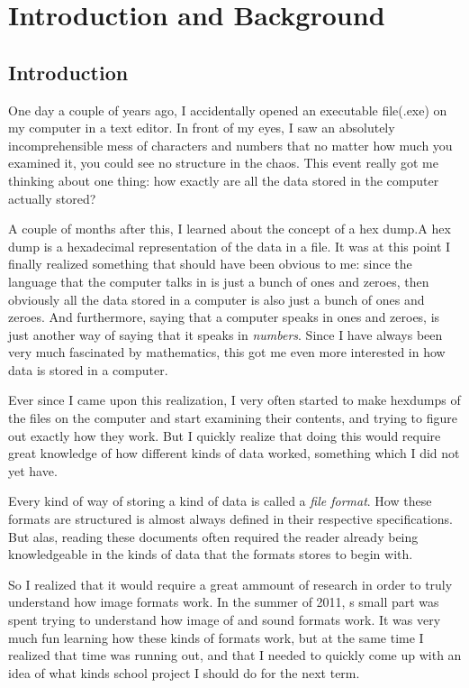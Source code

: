 
\chapter{Introduction and Background}

\section{Introduction}

One day a couple of years ago, I accidentally opened an executable
file(.exe) on my computer in a text editor. In front of my eyes, I saw
an absolutely incomprehensible mess of characters and numbers that no
matter how much you examined it, you could see no structure in the
chaos. This event really got me thinking about one thing: how exactly
are all the data stored in the computer actually stored?

A couple of months after this, I learned about the concept of a hex
dump.A hex dump is a hexadecimal representation of the data in a
file. It was at this point I finally realized something that should
have been obvious to me: since the language that the computer talks in
is just a bunch of ones and zeroes, then obviously all the data stored
in a computer is also just a bunch of ones and zeroes. And
furthermore, saying that a computer speaks in ones and zeroes, is just
another way of saying that it speaks in \textit{numbers}. Since I have
always been very much fascinated by mathematics, this got me even more
interested in how data is stored in a computer.

Ever since I came upon this realization, I very often started to make
hexdumps of the files on the computer and start examining their
contents, and trying to figure out exactly how they work. But I
quickly realize that doing this would require great knowledge of how
different kinds of data worked, something which I did not yet have.

Every kind of way of storing a kind of data is called a \textit{file
  format}. How these formats are structured is almost always defined
in their respective specifications. But alas, reading these documents
often required the reader already being knowledgeable in the kinds of
data that the formats stores to begin with.

So I realized that it would require a great ammount of research in
order to truly understand how image formats work. In the summer of
2011, s small part was spent trying to understand how image of and
sound formats work. It was very much fun learning how these kinds of
formats work, but at the same time I realized that time was running
out, and that I needed to quickly come up with an idea of what kinds
school project I should do for the next term.


